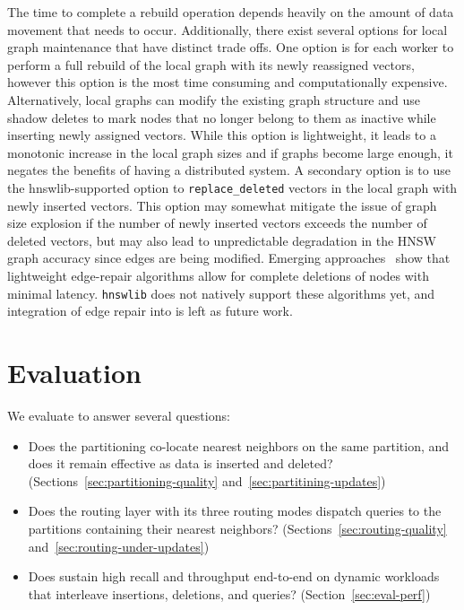 \documentclass[sigconf,review,anonymous]{acmart}
\begin{document}
    The time to complete a rebuild operation depends heavily on the amount of data movement that needs to occur. Additionally, there exist several options for local graph maintenance that have distinct trade offs. One option is for each worker to perform a full rebuild of the local graph with its newly reassigned vectors, however this option is the most time consuming and computationally expensive. Alternatively, local graphs can modify the existing graph structure and use shadow deletes to mark nodes that no longer belong to them as inactive while inserting newly assigned vectors. While this option is lightweight, it leads to a monotonic increase in the local graph sizes and if graphs become large enough, it negates the benefits of having a distributed system. A secondary option is to use the hnswlib-supported option to \texttt{replace\_deleted} vectors in the local graph with newly inserted vectors. This option may somewhat mitigate the issue of graph size explosion if the number of newly inserted vectors exceeds the number of deleted vectors, but may also lead to unpredictable degradation in the HNSW graph accuracy since edges are being modified. Emerging approaches~\cite{yu2025topology, xiao2024enhancing, xu2025place} show that lightweight edge-repair algorithms allow for complete deletions of nodes with minimal latency. \texttt{hnswlib} does not natively support these algorithms yet, and integration of edge repair into \SystemName{} is left as future work.
    
\section{Evaluation}
We evaluate \SystemName{} to answer several questions:
\begin{itemize}
    \item[\textbf{Q1.}] Does the partitioning co-locate nearest neighbors on the same partition, and does it remain effective as data is inserted and deleted? (Sections~\ref{sec:partitioning-quality} and~\ref{sec:partitining-updates})
    \item[\textbf{Q2.}] Does the routing layer with its three routing modes dispatch queries to the partitions containing their nearest neighbors? (Sections~\ref{sec:routing-quality} and~\ref{sec:routing-under-updates})
    \item[\textbf{Q3.}] Does \SystemName{} sustain high recall and throughput end-to-end on dynamic workloads that interleave insertions, deletions, and queries? (Section~\ref{sec:eval-perf})
\end{itemize}
\end{document}
